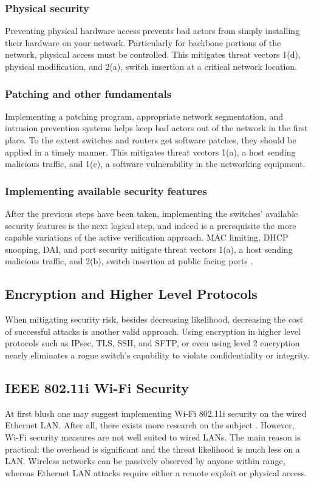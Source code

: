 \documentclass[journal]{IEEEtran}
\begin{document}
\subsubsection{Physical security}
Preventing physical hardware access prevents bad actors from simply installing their hardware on
your network. Particularly for backbone portions of the network, physical access must be controlled.
This mitigates threat vectors 1(d), physical modification, and 2(a), switch insertion at a
critical network location.

\subsubsection{Patching and other fundamentals}
Implementing a patching program, appropriate network segmentation, and intrusion prevention systems
helps keep bad actors out of the network in the first place. To the extent switches and routers get
software patches, they should be applied in a timely manner. This mitigates threat vectors 1(a), a
host sending malicious traffic, and 1(c), a software vulnerability in the networking equipment.

\subsubsection{Implementing available security features}
After the previous steps have been taken, implementing the switches' available security features is
the next logical step, and indeed is a prerequisite the more capable variations of the active
verification approach. MAC limiting, DHCP snooping, DAI, and port security mitigate threat vectors
1(a), a host sending malicious traffic, and 2(b), switch insertion at public facing ports \cite{b1}.


\subsection{Encryption and Higher Level Protocols}
When mitigating security risk, besides decreasing likelihood, decreasing the cost of successful
attacks is another valid approach. Using encryption in higher level protocols such as IPsec, TLS,
SSH, and SFTP, or even using level 2 encryption \cite{b3} nearly eliminates a rogue switch's
capability to violate confidentiality or integrity.


\subsection{IEEE 802.11i Wi-Fi Security}
At first blush one may suggest implementing Wi-Fi 802.11i security on the wired Ethernet LAN. After
all, there exists more research on the subject \cite{b4}\cite{b5}. However, Wi-Fi security measures
are not well suited to wired LANs. The main reason is practical: the overhead is significant and
the threat likelihood is much less on a LAN. Wireless networks can be passively observed by anyone
within range, whereas Ethernet LAN attacks require either a remote exploit or physical access.
\end{document}
